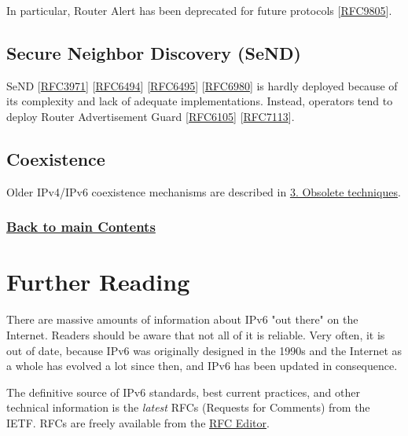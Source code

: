 \documentclass[
]{article}
\begin{document}
In particular, Router Alert has been deprecated for future protocols
{[}\href{https://www.rfc-editor.org/info/rfc9805}{RFC9805}{]}.

\subsection{Secure Neighbor Discovery
(SeND)}\label{secure-neighbor-discovery-send}

SeND {[}\href{https://www.rfc-editor.org/info/rfc3971}{RFC3971}{]}
{[}\href{https://www.rfc-editor.org/info/rfc6494}{RFC6494}{]}
{[}\href{https://www.rfc-editor.org/info/rfc6495}{RFC6495}{]}
{[}\href{https://www.rfc-editor.org/info/rfc6980}{RFC6980}{]} is hardly
deployed because of its complexity and lack of adequate implementations.
Instead, operators tend to deploy Router Advertisement Guard
{[}\href{https://www.rfc-editor.org/info/rfc6105}{RFC6105}{]}
{[}\href{https://www.rfc-editor.org/info/rfc7113}{RFC7113}{]}.

\subsection{Coexistence}\label{coexistence}

Older IPv4/IPv6 coexistence mechanisms are described in
\hyperref[obsolete-techniques]{3. Obsolete techniques}.

\subsubsection{\texorpdfstring{\hyperref[list-of-contents]{Back to main
Contents}}{Back to main Contents}}\label{back-to-main-contents-9}

\pagebreak

\section{Further Reading}\label{further-reading}

There are massive amounts of information about IPv6 "out there" on the
Internet. Readers should be aware that not all of it is reliable. Very
often, it is out of date, because IPv6 was originally designed in the
1990s and the Internet as a whole has evolved a lot since then, and IPv6
has been updated in consequence.

The definitive source of IPv6 standards, best current practices, and
other technical information is the \emph{latest} RFCs (Requests for
Comments) from the IETF. RFCs are freely available from the
\href{https://www.rfc-editor.org/}{RFC Editor}.
\end{document}
